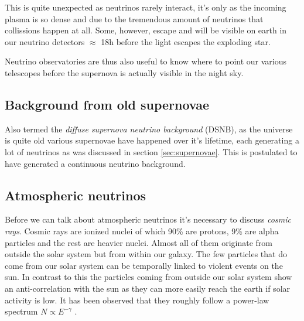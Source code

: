 This is quite unexpected as neutrinos rarely interact, it's only as the
incoming plasma is so dense and due to the tremendous amount of neutrinos that
collissions happen at all. Some, however, escape and will be visible on earth
in our neutrino detectors $\approx$ 18h before the light escapes the exploding
star.

Neutrino observatories are thus also useful to know where to point our various
telescopes before the supernova is actually visible in the night sky.
\subsection{Background from old supernovae}
Also termed the \textit{diffuse supernova neutrino background} (DSNB), as the
universe is quite old various supernovae have happened over it's lifetime, each generating
a lot of neutrinos as was discussed in section \ref{sec:supernovae}. 
This is postulated to have generated a continuous neutrino background.
\subsection{Atmospheric neutrinos}
\label{sec:AtmosphericNeutrinos}
Before we can talk about atmospheric neutrinos it's necessary to discuss \textit{cosmic rays}.
Cosmic rays are ionized nuclei of which 90\% are protons, 9\% are alpha particles and
the rest are heavier nuclei. Almost all of them originate from outside the solar system but
from within our galaxy. The few particles that do come from our solar system can be temporally
linked to violent events on the sun. In contrast to this the particles coming from outside
our solar system show an anti-correlation with the sun as they can more easily reach the earth
if solar activity is low.
It has been observed that they roughly follow a power-law spectrum 
$N \propto E^{-\gamma}$ \cite{gaisser_engel_resconi_2016}.

